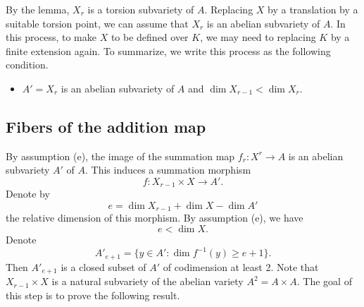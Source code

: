 By the lemma, $X_r$ is a torsion subvariety of $A$. Replacing $X$ by a translation by a suitable torsion point, we can assume that $X_r$ is an abelian subvariety of $A$. In this process, to make $X$ to be defined over $K$, we may need to replacing $K$ by a finite extension again.
To summarize, we write this process as the following condition.
\begin{itemize}
\item[(e)] $A'=X_r$ is an abelian subvariety of $A$ and $\dim X_{r-1}<\dim X_r$.
\end{itemize}



\subsection{Fibers of the addition map}

By assumption (e), the image of the summation map $f_r:X^r\to A$
is an abelian subvariety $A'$ of $A$.
This induces a summation morphism
$$f:X_{r-1}\times X\longrightarrow A'.$$
Denote by
$$e=\dim X_{r-1}+\dim X-\dim A'$$
the relative dimension of this morphism.
By assumption (e), we have
$$e<\dim X.$$
Denote
$$
A'_{e+1}=\{y\in A': \dim f^{-1}(y)\geq e+1 \}.
$$
Then $A'_{e+1}$ is a closed subset of $A'$ of codimension at least 2.
Note that $X_{r-1}\times X$ is a natural subvariety of the abelian variety $A^2=A\times A$.
The goal of this step is to prove the following result.

